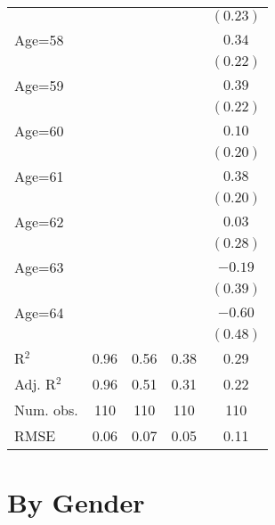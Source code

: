 \documentclass[fullpage]{paper}
\begin{document}
\begin{center}
\begin{longtable}{l c c c c }
            &               &               &               & $(0.23)$      \\
Age=58      &               &               &               & $0.34$        \\
            &               &               &               & $(0.22)$      \\
Age=59      &               &               &               & $0.39$        \\
            &               &               &               & $(0.22)$      \\
Age=60      &               &               &               & $0.10$        \\
            &               &               &               & $(0.20)$      \\
Age=61      &               &               &               & $0.38$        \\
            &               &               &               & $(0.20)$      \\
Age=62      &               &               &               & $0.03$        \\
            &               &               &               & $(0.28)$      \\
Age=63      &               &               &               & $-0.19$       \\
            &               &               &               & $(0.39)$      \\
Age=64      &               &               &               & $-0.60$       \\
            &               &               &               & $(0.48)$      \\
\hline
R$^2$       & 0.96          & 0.56          & 0.38          & 0.29          \\
Adj. R$^2$  & 0.96          & 0.51          & 0.31          & 0.22          \\
Num. obs.   & 110           & 110           & 110           & 110           \\
RMSE        & 0.06          & 0.07          & 0.05          & 0.11          \\
\end{longtable}
\end{center}
\section{ By Gender }
\end{document}
